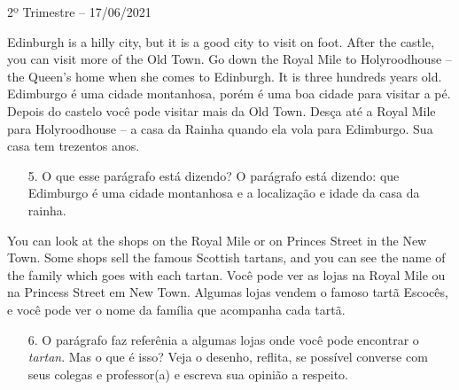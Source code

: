 \documentclass{SchoolBook}
\begin{document}
\begin{day}{2º Trimestre -- 17/06/2021}
        \begin{multicols}{2}
            Edinburgh is a hilly city, but it is a good city to visit on foot. After the castle, you can visit more of the Old Town. Go down the Royal Mile to Holyroodhouse -- the Queen's home when she comes to Edinburgh. It is three hundreds years old.
            \vfill\columnbreak
            Edimburgo é uma cidade montanhosa, porém é uma boa cidade para visitar a pé. Depois do castelo você pode visitar mais da Old Town. Desça até a Royal Mile para Holyroodhouse -- a casa da Rainha quando ela vola para Edimburgo. Sua casa tem trezentos anos.
        \end{multicols}
        
        \begin{enumerate}
            \item[5.] O que esse parágrafo está dizendo?
            \response O parágrafo está dizendo: que Edimburgo é uma cidade montanhosa e a localização e idade da casa da rainha.
        \end{enumerate}
        
        \begin{multicols}{2}
            You can look at the shops on the Royal Mile or on Princes Street in the New Town. Some shops sell the famous Scottish tartans, and you can see the name of the family which goes with each tartan.
            \vfill\columnbreak
            Você pode ver as lojas na Royal Mile ou na Princess Street em New Town. Algumas lojas vendem o famoso tartã Escocês, e você pode ver o nome da família que acompanha cada tartã.
        \end{multicols}
        
        \begin{enumerate}
            \item[6.] O parágrafo faz referênia a algumas lojas onde você pode encontrar o \emph{tartan}. Mas o que é isso? Veja o desenho, reflita, se possível converse com seus colegas e professor(a) e escreva sua opinião a respeito.
        \end{enumerate}
    \end{day}
\end{document}
